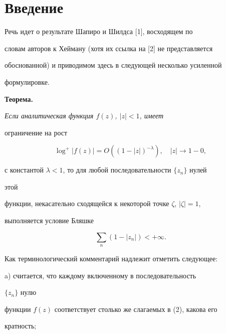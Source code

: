 


 


\section{Введение} 


 


Речь идет о результате Шапиро и Шилдса [1], восходящем по 


словам авторов к Хейману (хотя их ссылка на [2] не представляется 


обоснованной) и приводимом здесь в следующей несколько усиленной 


формулировке. 


\medskip 


 


{\bf Теорема.} {\it Если аналитическая функция $f(z)$, $|z|<1$, имеет 


ограничение на рост 


\begin{equation} 


\log^+|f(z)|=O((1-|z|)^{-\lambda}),\quad |z|\to1-0, 


\end{equation} 


с константой $\lambda<1$, то для любой последовательности $\{z_n\}$ нулей 


этой 


функции, некасательно сходящейся к некоторой точке $\zeta$, $|\zeta|=1$, 


выполняется условие Бляшке}


\begin{equation} 


\sum_n(1-|z_n|)<+\infty. 


\end{equation} 


 


Как терминологический комментарий надлежит отметить следующее: 


 


a) считается, что каждому включенному в последовательность


$\{z_n\}$ нулю 


функции $f(z)$ соответствует столько же слагаемых в (2), какова его 


кратность; 


